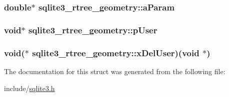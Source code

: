\hypertarget{structsqlite3__rtree__geometry_0c8490f1e003fd50729b87fa97bf0526}{
\subsubsection[aParam]{\setlength{\rightskip}{0pt plus 5cm}double$\ast$ {\bf sqlite3\_\-rtree\_\-geometry::aParam}}}
\label{structsqlite3__rtree__geometry_0c8490f1e003fd50729b87fa97bf0526}


\hypertarget{structsqlite3__rtree__geometry_dd62e1cd5faa6000c815104af3c540d0}{
\subsubsection[pUser]{\setlength{\rightskip}{0pt plus 5cm}void$\ast$ {\bf sqlite3\_\-rtree\_\-geometry::pUser}}}
\label{structsqlite3__rtree__geometry_dd62e1cd5faa6000c815104af3c540d0}


\hypertarget{structsqlite3__rtree__geometry_fa1ed10f488b306df354efe56efdf287}{
\subsubsection[xDelUser]{\setlength{\rightskip}{0pt plus 5cm}void($\ast$ {\bf sqlite3\_\-rtree\_\-geometry::xDelUser})(void $\ast$)}}
\label{structsqlite3__rtree__geometry_fa1ed10f488b306df354efe56efdf287}




The documentation for this struct was generated from the following file:\begin{CompactItemize}
\item 
include/\hyperlink{sqlite3_8h}{sqlite3.h}\end{CompactItemize}

